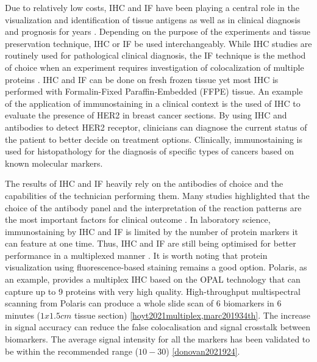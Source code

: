 Due to relatively low costs, IHC and IF have been playing a central role in the visualization and identification of tissue antigens as well as in clinical diagnosis and prognosis for years \cite{ducheyne2015comprehensive, rupprecht2015current}. Depending on the purpose of the experiments and tissue preservation technique, IHC or IF be used interchangeably. While IHC studies are routinely used for pathological clinical diagnosis, the IF technique is the method of choice when an experiment requires investigation of colocalization of multiple proteins \cite{joshi2017immunofluorescence}. IHC and IF can be done on fresh frozen tissue yet most IHC is performed with Formalin-Fixed Paraffin-Embedded (FFPE) tissue. An example of the application of immunostaining in a clinical context is the used of IHC to evaluate the presence of HER2 in breast cancer sections. By using IHC and antibodies to detect HER2 receptor, clinicians can diagnose the current status of the patient to better decide on treatment options. Clinically, immunostaining is used for histopathology for the diagnosis of specific types of cancers based on known molecular markers.  

The results of IHC and IF heavily rely on the antibodies of choice and the capabilities of the technician performing them. Many studies highlighted that the choice of the antibody panel and the interpretation of the reaction patterns are the most important factors for  clinical outcome \cite{de2010immunohistochemistry, jensen1997immunohistochemistry}. In laboratory science, immunostaining by IHC and IF is limited by the number of protein markers it can feature at one time. Thus, IHC and IF are still being optimised for better performance in a multiplexed manner \cite{joshi2017immunofluorescence}. It is worth noting that protein visualization using fluorescence-based staining remains a good option. Polaris, as an example, provides a multiplex IHC based on the OPAL technology that can capture up to 9 proteins with very high quality. High-throughput multispectral scanning from Polaris can produce a whole slide scan of 6 biomarkers in 6 minutes ($1x1.5cm$ tissue section) \ref{hoyt2021multiplex,marc201934th}. The increase in signal accuracy can reduce the false colocalisation and signal crosstalk between biomarkers. The average signal intensity for all the markers has been validated to be within the recommended range ($10-30$) \ref{donovan2021924}.  

